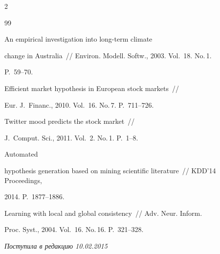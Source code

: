 \begin{multicols}{2}
{{\begin{thebibliography}{99}


 An empirical investigation into long-term climate


change in Australia~// Environ. Modell. Softw., 2003. Vol.~18. No.\,1.


P.~59--70.




 Efficient market hypothesis in European stock markets~//


Eur. J.~Financ., 2010. Vol.~16. No.\,7. P.~711--726.




 Twitter mood predicts the stock market~//


J.~Comput. Sci., 2011. Vol.~2. No.\,1. P.~1--8.




 Automated


hypothesis generation based on mining scientific literature~// KDD'14 Proceedings,


2014. P.~1877--1886.






Learning with local and global consistency~// Adv. Neur. Inform.


Proc. Syst., 2004.  Vol.~16. No.\,16. P.~321--328.





\end{thebibliography}


} }





\end{multicols}





 \label{end\stat}





 \vspace*{-3pt}





\hfill{\small\textit{Поступила в редакцию 10.02.2015}}


\renewcommand{\bibname}{\protect\rm Литература}


\renewcommand{\figurename}{\protect\bf Рис.}





